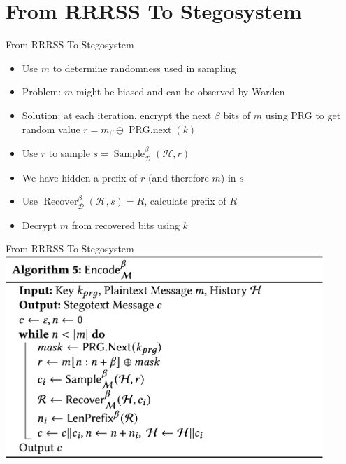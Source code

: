 \documentclass[10pt]{beamer}
\begin{document}
    \section{From RRRSS To Stegosystem}
    
    \begin{frame}{From RRRSS To Stegosystem}
        \begin{itemize}[<+- | alert@+>]
            \item Use $m$ to determine randomness used in sampling
            \item Problem: $m$ might be biased and can be observed by Warden
            \item Solution: at each iteration, encrypt the next $\beta$ bits of $m$ using PRG to get random value $r = m_{\beta} \oplus \operatorname{PRG.next}(k)$
            \item Use $r$ to sample $s = \operatorname{Sample}_\mathcal{D}^\beta(\mathcal{H}, r)$
            \item We have hidden a prefix of $r$ (and therefore $m$) in $s$
            \item Use $\operatorname{Recover}^\beta_\mathcal{D}(\mathcal{H}, s) = R$, calculate prefix of $R$
            \item Decrypt $m$ from recovered bits using $k$
        \end{itemize}
    \end{frame}
        
    \begin{frame}{From RRRSS To Stegosystem}
        \centering
        \includegraphics[width=0.9\textwidth]{alg-encode.png}
    \end{frame}
    
\end{document}
